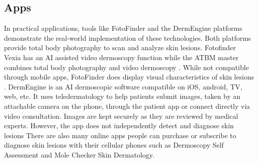 \documentclass[10pt,twocolumn]{article}
\begin{document}
\subsection{Apps}
In practical applications, tools like FotoFinder and the DermEngine platforms demonstrate the real-world implementation of these technologies. Both platforms provide total body photography to scan and analyze skin lesions. Fotofinder Vexia has an AI assisted video dermoscopy function while the ATBM master combines total body photography and video dermoscopy . While not compatible through mobile apps, FotoFinder does display visual characteristics of skin lesions \cite{humans.txt}.\newline \newline
DermEngine is an AI dermoscopic software compatible on iOS, android, TV, web, etc. It uses teledermatology to help patients submit images, taken by an attachable camera on the phone, through the patient app or connect directly via video consultation. Images are kept securely as they are reviewed by medical experts. However, the app does not independently detect and diagnose skin lesions\cite{Inc.}
\newline \newline
There are also many online apps people can purchase or subscribe to diagnose skin lesions with their cellular phones such as Dermoscopy Self Assessment and Mole Checker Skin Dermatology.
\end{document}
